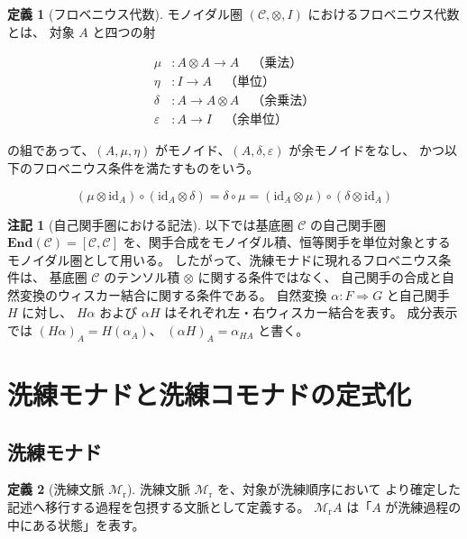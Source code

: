 \documentclass[11pt,a4paper]{article}
\theoremstyle{definition}
\newtheorem{definition}{定義}[section]
\newtheorem{remark}{注記}[section]
\newcommand{\Mr}{\mathcal{M}_{\mathrm{r}}}
\newcommand{\id}{\mathrm{id}}
\newcommand{\End}{\mathbf{End}}
\begin{document}
\begin{definition}[フロベニウス代数]
モノイダル圏 $(\mathcal{C}, \otimes, I)$ におけるフロベニウス代数とは、
対象 $A$ と四つの射

\begin{align}
\mu &: A \otimes A \to A \quad \text{（乗法）}\\
\eta &: I \to A \quad \text{（単位）}\\
\delta &: A \to A \otimes A \quad \text{（余乗法）}\\
\varepsilon &: A \to I \quad \text{（余単位）}
\end{align}

の組であって、$(A, \mu, \eta)$ がモノイド、$(A, \delta, \varepsilon)$ が余モノイドをなし、
かつ以下のフロベニウス条件を満たすものをいう。

\begin{equation}
(\mu \otimes \id_A) \circ (\id_A \otimes \delta)
= \delta \circ \mu
= (\id_A \otimes \mu) \circ (\delta \otimes \id_A)
\label{eq:frobenius_algebra}
\end{equation}
\end{definition}

\begin{remark}[自己関手圏における記法]
以下では基底圏 $\mathcal{C}$ の自己関手圏
$\End(\mathcal{C}) = [\mathcal{C},
\mathcal{C}]$ を、関手合成をモノイダル積、恒等関手を単位対象とする
モノイダル圏として用いる。
したがって、洗練モナドに現れるフロベニウス条件は、
基底圏 $\mathcal{C}$ のテンソル積 $\otimes$ に関する条件ではなく、
自己関手の合成と自然変換のウィスカー結合に関する条件である。
自然変換 $\alpha: F \Rightarrow G$ と自己関手 $H$ に対し、
$H\alpha$ および $\alpha H$ はそれぞれ左・右ウィスカー結合を表す。
成分表示では $(H\alpha)_A = H(\alpha_A)$、
$(\alpha H)_A = \alpha_{H A}$ と書く。
\end{remark}

\section{洗練モナドと洗練コモナドの定式化}

\subsection{洗練モナド}

\begin{definition}[洗練文脈 $\Mr$]
洗練文脈 $\Mr$ を、対象が洗練順序において
より確定した記述へ移行する過程を包摂する文脈として定義する。
$\Mr A$ は「$A$ が洗練過程の中にある状態」を表す。
\end{definition}
\end{document}
